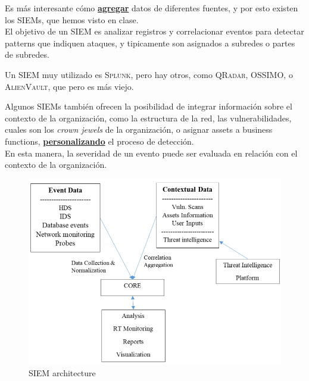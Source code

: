 \begin{paracol}{2}
   \colfill
   Es más interesante cómo \ul{\textbf{agregar}} datos de diferentes fuentes, y por esto existen los \textsc{SIEM}s, que hemos visto en clase.\\
   El objetivo de un \textsc{SIEM} es analizar registros y correlacionar eventos para detectar patterns que indiquen ataques, y tipicamente son asignados a subredes o partes de subredes.

   Un \textsc{SIEM} muy utilizado es \textsc{Splunk}, pero hay otros, como \textsc{QRadar}, \textsc{OSSIMO}, o \textsc{AlienVault}, que pero es más viejo.
   
   Algunos \textsc{SIEM}s también ofrecen la posibilidad de integrar información sobre el contexto de la organización, como la estructura de la red, las vulnerabilidades, cuales son los \textit{crown jewels} de la organización, o asignar assets a business functions, \ul{\textbf{personalizando}} el proceso de detección.\\
   En esta manera, la severidad de un evento puede ser evaluada en relación con el contexto de la organización.
   \colfill

   \switchcolumn

   \begin{figure}[htbp]
      \centering
      \includegraphics[width=0.9\columnwidth]{images/siem.png}
      \caption{\textsc{SIEM} architecture}
      \label{fig:SIEM}
   \end{figure}
\end{paracol}


